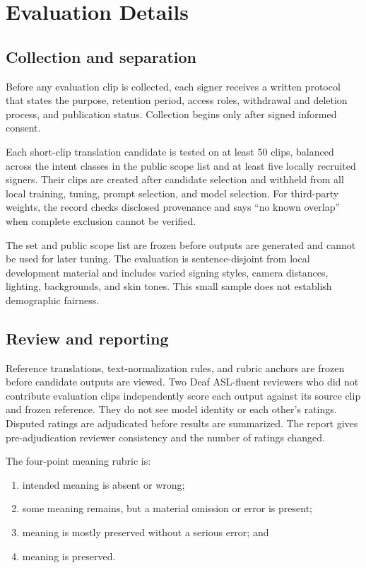 \documentclass[11pt]{article}
\begin{document}
\section{Evaluation Details}
\label{app:evaluation}

\subsection{Collection and separation}

Before any evaluation clip is collected, each signer receives a written protocol that
states the purpose, retention period, access roles, withdrawal and deletion process,
and publication status. Collection begins only after signed informed consent.

Each short-clip translation candidate is tested on at least 50 clips, balanced across
the intent classes in the public scope list and at least five locally recruited
signers. Their clips are created after candidate selection and withheld from all local
training, tuning, prompt selection, and model selection. For third-party weights, the
record checks disclosed provenance and says ``no known overlap'' when complete
exclusion cannot be verified.

The set and public scope list are frozen before outputs are generated and cannot be
used for later tuning. The evaluation is sentence-disjoint from local development
material and includes varied signing styles, camera distances, lighting, backgrounds,
and skin tones. This small sample does not establish demographic fairness.

\subsection{Review and reporting}

Reference translations, text-normalization rules, and rubric anchors are frozen
before candidate outputs are viewed. Two Deaf ASL-fluent reviewers who did not
contribute evaluation clips independently score each output against its source clip
and frozen reference. They do not see model identity or each other's ratings. Disputed
ratings are adjudicated before results are summarized. The report gives
pre-adjudication reviewer consistency and the number of ratings changed.

The four-point meaning rubric is:

\begin{enumerate}[nosep]
  \item intended meaning is absent or wrong;
  \item some meaning remains, but a material omission or error is present;
  \item meaning is mostly preserved without a serious error; and
  \item meaning is preserved.
\end{enumerate}
\end{document}
